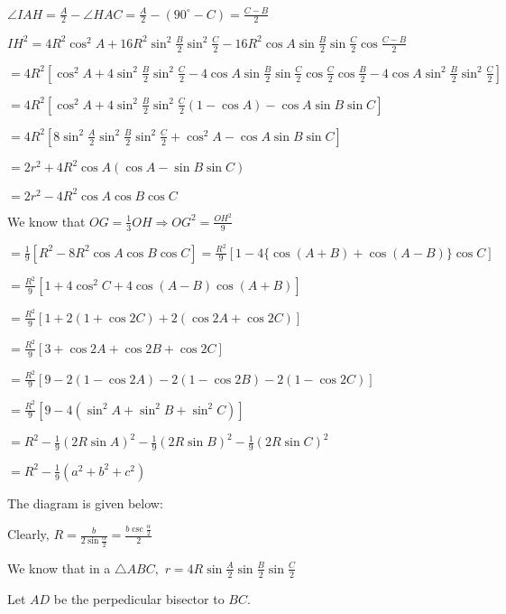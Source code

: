   $\angle IAH = \frac{A}{2} - \angle HAC = \frac{A}{2} - (90^\circ - C) = \frac{C - B}{2}$

  $IH^2 = 4R^2\cos^2A + 16R^2\sin^2\frac{B}{2}\sin^2\frac{C}{2} - 16R^2\cos A\sin\frac{B}{2}\sin\frac{C}{2}\cos\frac{C - B}{2}$

  $= 4R^2\left[\cos^2A + 4\sin^2\frac{B}{2}\sin^2\frac{C}{2} - 4\cos A\sin\frac{B}{2}\sin\frac{C}{2}\cos\frac{C}{2}\cos\frac{B}{2} - 4\cos A\sin^2\frac{B}{2}\sin^2\frac{C}{2}\right]$

  $= 4R^2\left[\cos^2A + 4\sin^2\frac{B}{2}\sin^2\frac{C}{2}(1 - \cos A) - \cos A\sin B\sin C\right]$

  $= 4R^2\left[8\sin^2\frac{A}{2}\sin^2\frac{B}{2}\sin^2\frac{C}{2} + \cos^2A - \cos A\sin B\sin C\right]$

  $= 2r^2 + 4R^2\cos A(\cos A - \sin B\sin C)$

  $= 2r^2 - 4R^2\cos A\cos B\cos C$

\item We know that $OG = \frac{1}{3}OH \Rightarrow OG^2 = \frac{OH^2}{9}$

  $= \frac{1}{9}[R^2 - 8R^2\cos A\cos B\cos C] = \frac{R^2}{9}[1 - 4\{\cos(A + B) + \cos(A - B)\}\cos C]$

  $= \frac{R^2}{9}[1 + 4\cos^2C + 4\cos(A - B)\cos(A + B)]$

  $= \frac{R^2}{9}[1 + 2(1 + \cos 2C) +2(\cos 2A + \cos 2C)]$

  $= \frac{R^2}{9}[3 + \cos 2A + \cos 2B + \cos 2C]$

  $= \frac{R^2}{9}[9 - 2(1 - \cos 2A) - 2(1 - \cos 2B) - 2(1 - \cos 2C)]$

  $= \frac{R^2}{9}[9 - 4(\sin^2A + \sin^2B + \sin^2C)]$

  $= R^2 - \frac{1}{9}(2R\sin A)^2 - \frac{1}{9}(2R\sin B)^2 - \frac{1}{9}(2R\sin C)^2$

  $= R^2 - \frac{1}{9}(a^2 + b^2 + c^2)$

\item The diagram is given below:

  \startplacefigure
    \externalfigure[21_9.pdf]
  \stopplacefigure

  Clearly, $R = \frac{b}{2\sin\frac{\alpha}{2}} = \frac{b\csc\frac{\alpha}{2}}{2}$

\item We know that in a $\triangle ABC,$ $r = 4R\sin\frac{A}{2}\sin\frac{B}{2}\sin\frac{C}{2}$

  Let $AD$ be the perpedicular bisector to $BC.$

